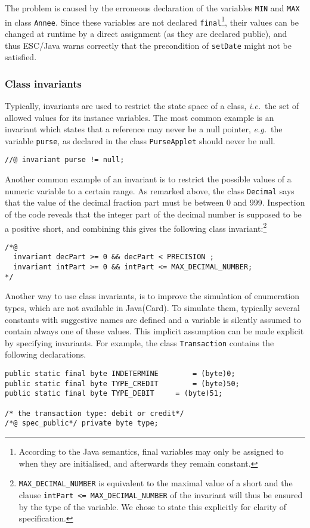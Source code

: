 \documentclass[a4paper]{llncs}
\begin{document}
The problem is caused by the erroneous declaration of the variables 
\texttt{MIN} and \texttt{MAX} in class \texttt{Annee}.
Since these variables are not declared 
\texttt{final}\footnote{According to the Java semantics, final
variables may only be assigned to when they are initialised, and
afterwards they remain constant.}, their values can be changed at
runtime by a direct assignment (as they are declared public), and thus
ESC/Java warns correctly that the precondition of \texttt{setDate}
might not be satisfied.








\subsubsection{Class invariants}
Typically, invariants are used to restrict the state space of a class,
\emph{i.e.}~the set of allowed values for its instance variables. The
most common example is an invariant which states that a reference may
never be a null pointer, \emph{e.g.}~the variable
\texttt{purse}, as declared in the class \texttt{PurseApplet}
should never be null.
\begin{verbatim}
//@ invariant purse != null;
\end{verbatim}
Another common example of an invariant is to restrict the possible
values of a numeric variable to a certain range. As remarked above,
the class \texttt{Decimal} says that the value of the decimal fraction
part must be between 0 and 999. Inspection of the code reveals that
the integer part of the decimal number is supposed to be a positive
short, and combining this gives the following class
invariant:\footnote{\texttt{MAX\_DECIMAL\_NUMBER} is equivalent to the
maximal value of a short and the clause \texttt{intPart <=
MAX\_DECIMAL\_NUMBER} of the invariant will thus be ensured by the
type of the variable. We chose to state this explicitly for clarity of
specification.}
\begin{verbatim}
/*@
  invariant decPart >= 0 && decPart < PRECISION ;
  invariant intPart >= 0 && intPart <= MAX_DECIMAL_NUMBER;
*/
\end{verbatim}

Another way to use class invariants, is to improve the simulation of
enumeration types, which are not available in Java(Card).  To simulate
them, typically several constants with suggestive names are defined
and a variable is silently assumed to contain always one of these
values. This implicit assumption can be made explicit by specifying
invariants. For example, the class \texttt{Transaction} contains the
following declarations.
\begin{verbatim}
public static final byte INDETERMINE		= (byte)0;
public static final byte TYPE_CREDIT		= (byte)50;
public static final byte TYPE_DEBIT		= (byte)51;
    
/* the transaction type: debit or credit*/
/*@ spec_public*/ private byte type;
\end{verbatim}
\end{document}
